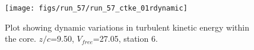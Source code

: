 \begin{figure}[H]
\centering
\texttt{[image: figs/run\_57/run\_57\_ctke\_01rdynamic]}
\caption{Plot showing dynamic variations in turbulent kinetic energy within the core. $z/c$=9.50, $V_{free}$=27.05, station 6.}
\label{fig:run_57_ctke_01rdynamic}
\end{figure}


